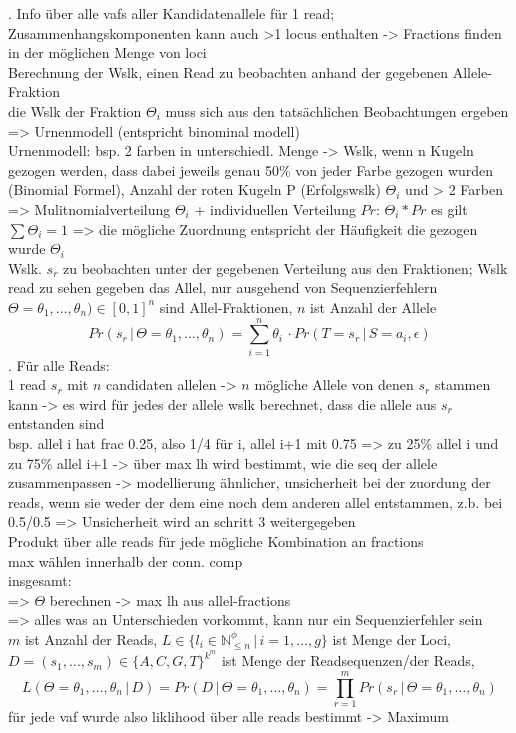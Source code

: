 . Info über alle vafs aller Kandidatenallele für 1 read; Zusammenhangskomponenten kann auch >1 locus enthalten -> Fractions finden in der möglichen Menge von loci \\
Berechnung der Wslk, einen Read zu beobachten anhand der gegebenen Allele-Fraktion\\
die Wslk der Fraktion $\Theta_{i}$ muss sich aus den tatsächlichen Beobachtungen ergeben => Urnenmodell (entspricht binominal modell)\\
Urnenmodell: bsp. 2 farben in unterschiedl. Menge -> Wslk, wenn n Kugeln gezogen werden, dass dabei jeweils genau 50\% von jeder Farbe gezogen wurden (Binomial Formel), Anzahl der roten Kugeln P (Erfolgswslk) $\Theta_{i}$ und  > 2 Farben => Mulitnomialverteilung $\Theta_{i}$ + individuellen Verteilung $Pr$: $\Theta_{i} * Pr$
es gilt $\sum \Theta_{i} = 1$ => die mögliche Zuordnung entspricht der Häufigkeit die gezogen wurde $\Theta_{i}$ \\
Wslk. $ s_{r} $ zu beobachten unter der gegebenen Verteilung aus den Fraktionen; Wslk read zu sehen gegeben das Allel, nur ausgehend von Sequenzierfehlern \\
$\Theta=\theta_{1},\dots,\theta_{n}) \in [0,1]^n $ sind Allel-Fraktionen, $n$ ist Anzahl der Allele \\
\begin{equation} \label{eqn:2-17}
\tag{2-17}
Pr(s_{r} \, | \, \Theta=\theta_{1},\dots,\theta_{n}) = \sum_{i=1}^{n}\theta_{i} \, \cdotp Pr(T=s_{r} \, | \, S=a_{i}, \epsilon)
\end{equation}
. Für alle Reads: \\
1 read $s_{r}$ mit $n$ candidaten allelen -> $n$ mögliche Allele von denen $s_{r}$ stammen kann -> es wird für jedes der allele wslk berechnet, dass die allele aus $s_{r}$ entstanden sind\\
bsp. allel i hat frac 0.25, also 1/4 für i, allel i+1 mit 0.75 => zu 25\% allel i und zu 75\% allel i+1 -> über max lh wird bestimmt, wie die seq der allele zusammenpassen -> modellierung ähnlicher,  unsicherheit bei der zuordung der reads, wenn sie weder der dem eine noch dem anderen allel entstammen, z.b. bei 0.5/0.5 => Unsicherheit wird an schritt 3 weitergegeben \\
Produkt über alle reads für jede mögliche Kombination an fractions \\
max wählen innerhalb der conn. comp\\
insgesamt:\\
=> $\Theta$ berechnen -> max lh aus allel-fractions\\
=> alles was an Unterschieden vorkommt, kann nur ein Sequenzierfehler sein\\
$m$ ist Anzahl der Reads, $L \in \{l_{i} \in \mathds{N}_{\leq n}^\phi \, | \, i=1, \dots, g\}$ ist Menge der Loci, $D = (s_{1}, \dots, s_{m}) \in \{A,C, G, T\}^{k^m}$ ist Menge der Readsequenzen/der Reads,
\begin{equation} \label{eqn:2-18}
\tag{2-18}
L(\Theta=\theta_{1},\dots,\theta_{n} \, | \, D) = Pr(D \, | \, \Theta=\theta_{1},\dots,\theta_{n}) = \prod_{r=1}^{m}Pr (s_{r} \, | \, \Theta=\theta_{1},\dots,\theta_{n})
\end{equation}
für jede vaf wurde also liklihood über alle reads bestimmt -> Maximum 
